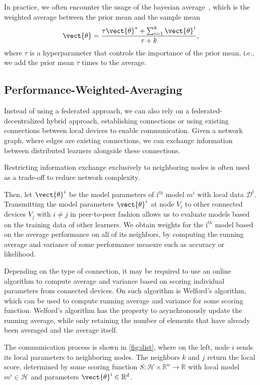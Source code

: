 In practice, we often encounter the usage of the bayesian average~\cite{de2011bayesian}, which is the weighted average between the prior mean and the sample mean
\begin{equation}
    \vect{\theta} = \frac{\tau \vect{\theta}^* + \sum_{i=1}^k \vect{\theta}^i}{\tau + k},
\end{equation}
where $\tau$ is a hyperparameter that controls the importance of the prior mean, i.e., we add the prior mean $\tau$ times to the average. 

\subsection{Performance-Weighted-Averaging}

Instead of using a federated approach, we can also rely on a federated-decentralized hybrid approach, establishing connections or using existing connections between local devices to enable communication.
Given a network graph, where edges are existing connections, we can exchange information between distributed learners alongside these connections.

Restricting information exchange exclusively to neighboring nodes is often used as a trade-off to reduce network complexity.

Then, let $\vect{\theta}^{i}$ be the model parameters of i$^{th}$ model $m^{i}$ with local data $\mathcal{D}^{i}$.
Transmitting the model parameters $\vect{\theta}^{i}$  at node $V_i$  to other connected devices  $V_j$ with $i \neq j$ in peer-to-peer fashion allows us to evaluate models based on the training data of other learners.
We obtain weights for the i$^{th}$ model based on the average performance on all of its neighbors, by computing the running average and variance of some performance measure such as accuracy or likelihood.

Depending on the type of connection, it may be required to use an online algorithm to compute average and variance based on scoring individual parameters from connected devices.
On such algorithm is Welford's algorithm, which can be used to compute running average and variance for some scoring function.
Welford's algorithm has the property to asynchronously update the running average, while only retaining the number of elements that have already been averaged and the average itself.

The communication process is shown in \fig \ref{fig:dist}, where on the left, node $i$ sends its local parameters to neighboring nodes. The neighbors $k$ and $j$ return the local score, determined by some scoring function $S: \mathcal{H} \times \mathbb{R}^n \rightarrow \mathbb{R}$ with local model $m^{i} \in \mathcal{H}$ and parameters $\vect{\theta}^{i} \in \mathbb{R}^d$.


